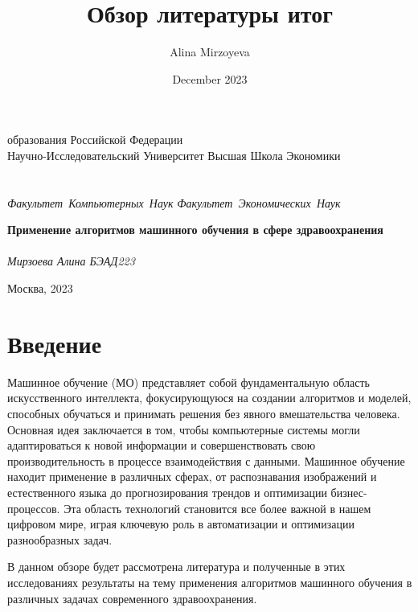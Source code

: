 \documentclass[14pt, a4paper]{extarticle}
\title{Обзор литературы итог}
\author{Alina Mirzoyeva}
\date{December 2023}
\begin{document}
\begin{titlepage}

\begin{center}
\vfill

 образования Российской Федерации\\
Научно-Исследовательский Университет Высшая Школа Экономики\\
\ \\

\\

\hfill\vbox
{\normalsize
\hbox{\textit{Факультет Компьютерных Наук}}
\hbox{\textit{Факультет Экономических Наук}}
}

\vfill
\vspace{10mm}

{\LARGE\bf Применение алгоритмов машинного обучения в сфере здравоохранения\\}
\ \\
\textit{Мирзоева Алина БЭАД223}

\vfill



\vfill

Москва, 2023
\end{center}

\end{titlepage}

\section{Введение}

Машинное обучение (МО) представляет собой фундаментальную область искусственного интеллекта, фокусирующуюся на создании алгоритмов и моделей, способных обучаться и принимать решения без явного вмешательства человека. Основная идея заключается в том, чтобы компьютерные системы могли адаптироваться к новой информации и совершенствовать свою производительность в процессе взаимодействия с данными. Машинное обучение находит применение в различных сферах, от распознавания изображений и естественного языка до прогнозирования трендов и оптимизации бизнес-процессов. Эта область технологий становится все более важной в нашем цифровом мире, играя ключевую роль в автоматизации и оптимизации разнообразных задач. 

В данном обзоре будет рассмотрена литература и полученные в этих исследованиях результаты на тему применения алгоритмов машинного обучения в различных задачах современного здравоохранения.
\end{document}
